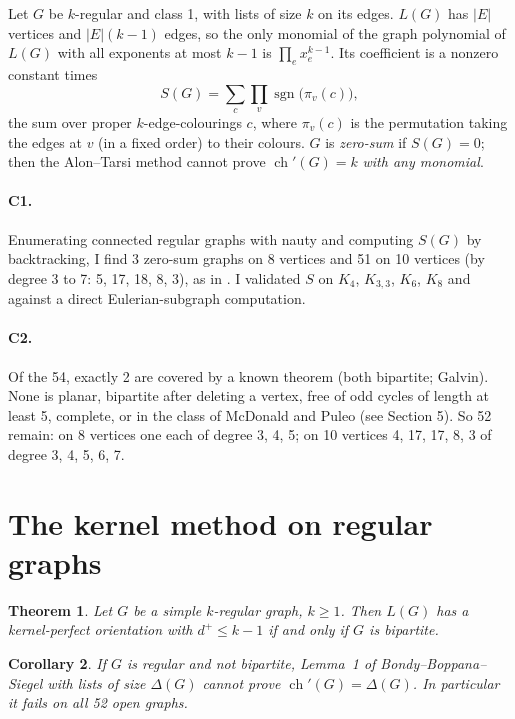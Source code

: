 \documentclass[11pt]{article}
\theoremstyle{plain}
\newtheorem{theorem}{Theorem}
\newtheorem{corollary}[theorem]{Corollary}
\theoremstyle{definition}
\theoremstyle{remark}
\newcommand{\ch}{\operatorname{ch}}
\newcommand{\dout}{d^{+}}
\begin{document}
Let $G$ be $k$-regular and class 1, with lists of size $k$ on its edges. $L(G)$ has $|E|$
vertices and $|E|(k-1)$ edges, so the only monomial of the graph polynomial of $L(G)$ with all
exponents at most $k-1$ is $\prod_e x_e^{k-1}$. Its coefficient is a nonzero constant times
\[
  S(G) = \sum_{c} \prod_{v} \operatorname{sgn}\bigl(\pi_v(c)\bigr),
\]
the sum over proper $k$-edge-colourings $c$, where $\pi_v(c)$ is the permutation taking the
edges at $v$ (in a fixed order) to their colours. $G$ is \emph{zero-sum} if $S(G) = 0$; then
the Alon--Tarsi method cannot prove $\ch'(G) = k$ \emph{with any monomial}.

\paragraph{C1.} Enumerating connected regular graphs with nauty and computing $S(G)$ by
backtracking, I find 3 zero-sum graphs on 8 vertices and 51 on 10 vertices (by degree 3 to 7:
5, 17, 18, 8, 3), as in \cite[\S4.1]{schauz}. I validated $S$ on $K_4$, $K_{3,3}$, $K_6$, $K_8$
and against a direct Eulerian-subgraph computation.

\paragraph{C2.} Of the 54, exactly 2 are covered by a known theorem (both bipartite; Galvin). None
is planar, bipartite after deleting a vertex, free of odd cycles of length at least 5, complete,
or in the class of McDonald and Puleo \cite{mp} (see Section 5). So 52 remain: on 8 vertices
one each of degree 3, 4, 5; on 10 vertices 4, 17, 17, 8, 3 of degree 3, 4, 5, 6, 7.

\section{The kernel method on regular graphs}

\begin{theorem}\label{thm:main}
Let $G$ be a simple $k$-regular graph, $k \ge 1$. Then $L(G)$ has a kernel-perfect orientation
with $\dout \le k-1$ if and only if $G$ is bipartite.
\end{theorem}

\begin{corollary}
If $G$ is regular and not bipartite, Lemma~1 of Bondy--Boppana--Siegel with lists of size
$\Delta(G)$ cannot prove $\ch'(G) = \Delta(G)$. In particular it fails on all 52 open graphs.
\end{corollary}
\end{document}
